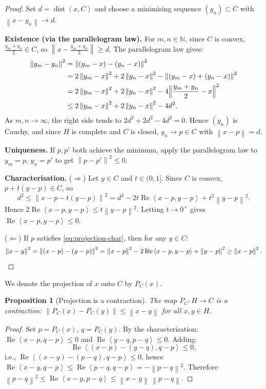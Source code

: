 \documentclass[a4paper,12pt]{book}
\DeclareMathOperator{\dist}{dist}
\newcommand{\N}{\mathbb{N}}
\newcommand{\norm}[1]{\left\| #1 \right\|}
\newcommand{\inner}[2]{\left\langle #1, #2 \right\rangle}
\theoremstyle{definition}
\theoremstyle{plain}
\newtheorem{proposition}[definition]{Proposition}
\theoremstyle{remark}
\begin{document}
\begin{proof}
Set $d=\dist(x,C)$ and choose a minimising sequence $(y_n)\subset C$
with $\norm{x-y_n}\to d$.

\textbf{Existence (via the parallelogram law).}
For $m,n\in\N$, since $C$ is convex,
$\frac{y_m+y_n}{2}\in C$, so
$\norm{x-\tfrac{y_m+y_n}{2}}\ge d$.  The parallelogram law gives:
\begin{align*}
  \norm{y_m-y_n}^2
  &= \norm{(y_m-x)-(y_n-x)}^2 \\
  &= 2\norm{y_m-x}^2+2\norm{y_n-x}^2-\norm{(y_m-x)+(y_n-x)}^2 \\
  &= 2\norm{y_m-x}^2+2\norm{y_n-x}^2-4\Bigl\|\frac{y_m+y_n}{2}-x\Bigr\|^2 \\
  &\le 2\norm{y_m-x}^2+2\norm{y_n-x}^2 - 4d^2.
\end{align*}
As $m,n\to\infty$, the right side tends to $2d^2+2d^2-4d^2=0$.
Hence $(y_n)$ is Cauchy, and since $H$ is complete and $C$ is closed,
$y_n\to p\in C$ with $\norm{x-p}=d$.

\textbf{Uniqueness.}  If $p,p'$ both achieve the minimum, apply the
parallelogram law to $y_m=p$, $y_n=p'$ to get $\norm{p-p'}^2\le 0$.

\textbf{Characterisation.}  ($\Rightarrow$) Let $y\in C$ and $t\in(0,1]$.
Since $C$ is convex, $p+t(y-p)\in C$, so
\[
  d^2 \le \norm{x-p-t(y-p)}^2
  = d^2 - 2t\operatorname{Re}\inner{x-p}{y-p}+t^2\norm{y-p}^2.
\]
Hence $2\operatorname{Re}\inner{x-p}{y-p}\le t\norm{y-p}^2$.  Letting
$t\to 0^+$ gives $\operatorname{Re}\inner{x-p}{y-p}\le 0$.

($\Leftarrow$)  If $p$ satisfies \eqref{eq:projection-char}, then for
any $y\in C$:
\[
  \norm{x-y}^2 = \norm{(x-p)-(y-p)}^2
  = \norm{x-p}^2 - 2\operatorname{Re}\inner{x-p}{y-p}+\norm{y-p}^2
  \ge \norm{x-p}^2. \qedhere
\]
\end{proof}

We denote the projection of $x$ onto $C$ by $P_C(x)$.

\begin{proposition}[Projection is a contraction]
\label{prop:projection-contraction}
The map $P_C:H\to C$ is a contraction:
$\norm{P_C(x)-P_C(y)}\le\norm{x-y}$ for all $x,y\in H$.
\end{proposition}

\begin{proof}
Set $p=P_C(x)$, $q=P_C(y)$.  By the characterisation:
$\operatorname{Re}\inner{x-p}{q-p}\le 0$ and
$\operatorname{Re}\inner{y-q}{p-q}\le 0$.  Adding:
\[
  \operatorname{Re}\inner{(x-p)-(y-q)}{q-p}\le 0,
\]
i.e., $\operatorname{Re}\inner{(x-y)-(p-q)}{q-p}\le 0$, hence
$\operatorname{Re}\inner{x-y}{q-p}\le\operatorname{Re}\inner{p-q}{q-p}=-\norm{p-q}^2$.
Therefore
$\norm{p-q}^2\le\operatorname{Re}\inner{x-y}{p-q}\le\norm{x-y}\,\norm{p-q}$.
\end{proof}
\end{document}
